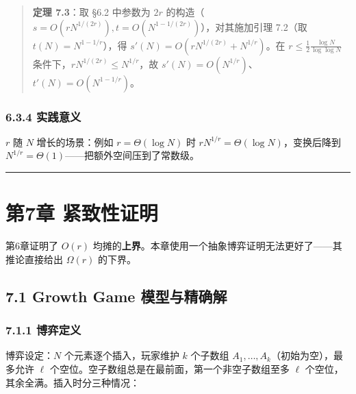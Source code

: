 \documentclass[
  UTF8,
  a4paper,
  12pt]{ctexart}
\begin{document}
\begin{quote}
\textbf{定理 7.3}：取 §6.2 中参数为 \(2r\)
的构造（\(s = O(rN^{1/(2r)}), t = O(N^{1-1/(2r)})\)），对其施加引理
7.2（取 \(t(N) = N^{1-1/r}\)），得
\(s'(N) = O(rN^{1/(2r)} + N^{1/r})\)。在
\(r \le \frac{1}{2}\frac{\log N}{\log \log N}\)
条件下，\(rN^{1/(2r)} \le N^{1/r}\)，故
\(s'(N) = O(N^{1/r})\)、\(t'(N) = O(N^{1-1/r})\)。
\end{quote}

\subsubsection{6.3.4 实践意义}\label{ux5b9eux8df5ux610fux4e49}

\(r\) 随 \(N\) 增长的场景：例如 \(r = \Theta(\log N)\) 时
\(rN^{1/r} = \Theta(\log N)\)，变换后降到
\(N^{1/r} = \Theta(1)\)------把额外空间压到了常数级。

\begin{center}\rule{0.5\linewidth}{0.5pt}\end{center}

\section{第7章
紧致性证明}\label{ux7b2c7ux7ae0-ux7d27ux81f4ux6027ux8bc1ux660e}

第6章证明了 \(O(r)\)
均摊的\textbf{上界}。本章使用一个抽象博弈证明无法更好了------其推论直接给出
\(\Omega(r)\) 的下界。

\subsection{7.1 Growth Game
模型与精确解}\label{growth-game-ux6a21ux578bux4e0eux7cbeux786eux89e3}

\subsubsection{7.1.1 博弈定义}\label{ux535aux5f08ux5b9aux4e49}

博弈设定：\(N\) 个元素逐个插入，玩家维护 \(k\) 个子数组
\(A_1, \dots, A_k\)（初始为空），最多允许 \(\ell\)
个空位。空子数组总是在最前面，第一个非空子数组至多 \(\ell\)
个空位，其余全满。插入时分三种情况：
\end{document}
